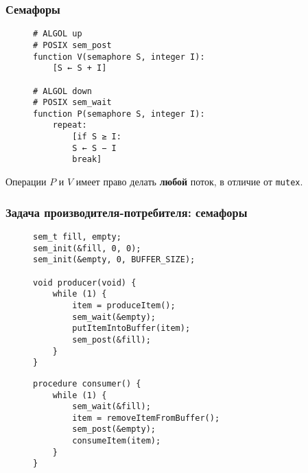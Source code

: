 \documentclass[aspectratio=169, pdf, 8pt, unicode]{beamer}
\begin{document}
\begin{frame}[fragile]
\frametitle{Семафоры}
\begin{figure}[H]
\centering
\begin{minipage}{0.4\textwidth}
\begin{verbatim}
# ALGOL up
# POSIX sem_post
function V(semaphore S, integer I):
    [S ← S + I]

# ALGOL down
# POSIX sem_wait
function P(semaphore S, integer I):
    repeat:
        [if S ≥ I:
        S ← S − I
        break]
\end{verbatim}
\end{minipage}
\end{figure}
Операции $P$ и $V$ имеет право делать \textbf{любой} поток, в отличие от \texttt{mutex}.
\end{frame}

\begin{frame}[fragile]
\frametitle{Задача производителя-потребителя: семафоры}
\begin{figure}[H]
\begin{minipage}{0.4\textwidth}
\begin{verbatim}
sem_t fill, empty;
sem_init(&fill, 0, 0);
sem_init(&empty, 0, BUFFER_SIZE);

void producer(void) {
    while (1) {
        item = produceItem();
        sem_wait(&empty);
        putItemIntoBuffer(item);
        sem_post(&fill);
    }
}
\end{verbatim}
\end{minipage}
\begin{minipage}{0.4\textwidth}
\begin{verbatim}
procedure consumer() {
    while (1) {
        sem_wait(&fill);
        item = removeItemFromBuffer();
        sem_post(&empty);
        consumeItem(item);
    }
}
\end{verbatim}
\end{minipage}
\end{figure}
\end{frame}
\end{document}
